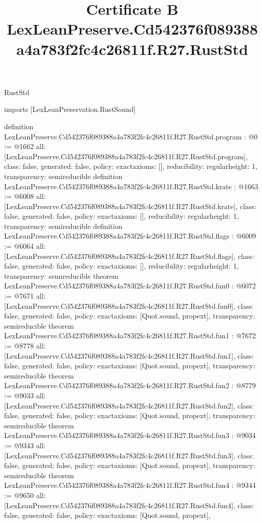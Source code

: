 \begin{lexlean}{RustStd}
\title{Certificate B LexLeanPreserve.Cd542376f089388a4a783f2fc4c26811f.R27.RustStd}
\begin{coremodule}
imports [LexLeanPreservation.RustSound]

definition LexLeanPreserve.Cd542376f089388a4a783f2fc4c26811f.R27.RustStd.program : @0 := @1662 {
  all: [LexLeanPreserve.Cd542376f089388a4a783f2fc4c26811f.R27.RustStd.program],
  class: false,
  generated: false,
  policy: exact{axioms: []},
  reducibility: regular{height: 1},
  transparency: semireducible
}
definition LexLeanPreserve.Cd542376f089388a4a783f2fc4c26811f.R27.RustStd.krate : @1663 := @6008 {
  all: [LexLeanPreserve.Cd542376f089388a4a783f2fc4c26811f.R27.RustStd.krate],
  class: false,
  generated: false,
  policy: exact{axioms: []},
  reducibility: regular{height: 1},
  transparency: semireducible
}
definition LexLeanPreserve.Cd542376f089388a4a783f2fc4c26811f.R27.RustStd.flags : @6009 := @6064 {
  all: [LexLeanPreserve.Cd542376f089388a4a783f2fc4c26811f.R27.RustStd.flags],
  class: false,
  generated: false,
  policy: exact{axioms: []},
  reducibility: regular{height: 1},
  transparency: semireducible
}
theorem LexLeanPreserve.Cd542376f089388a4a783f2fc4c26811f.R27.RustStd.fun0 : @6072 := @7671 {
  all: [LexLeanPreserve.Cd542376f089388a4a783f2fc4c26811f.R27.RustStd.fun0],
  class: false,
  generated: false,
  policy: exact{axioms: [Quot.sound, propext]},
  transparency: semireducible
}
theorem LexLeanPreserve.Cd542376f089388a4a783f2fc4c26811f.R27.RustStd.fun1 : @7672 := @8778 {
  all: [LexLeanPreserve.Cd542376f089388a4a783f2fc4c26811f.R27.RustStd.fun1],
  class: false,
  generated: false,
  policy: exact{axioms: [Quot.sound, propext]},
  transparency: semireducible
}
theorem LexLeanPreserve.Cd542376f089388a4a783f2fc4c26811f.R27.RustStd.fun2 : @8779 := @9033 {
  all: [LexLeanPreserve.Cd542376f089388a4a783f2fc4c26811f.R27.RustStd.fun2],
  class: false,
  generated: false,
  policy: exact{axioms: [Quot.sound, propext]},
  transparency: semireducible
}
theorem LexLeanPreserve.Cd542376f089388a4a783f2fc4c26811f.R27.RustStd.fun3 : @9034 := @9343 {
  all: [LexLeanPreserve.Cd542376f089388a4a783f2fc4c26811f.R27.RustStd.fun3],
  class: false,
  generated: false,
  policy: exact{axioms: [Quot.sound, propext]},
  transparency: semireducible
}
theorem LexLeanPreserve.Cd542376f089388a4a783f2fc4c26811f.R27.RustStd.fun4 : @9344 := @9650 {
  all: [LexLeanPreserve.Cd542376f089388a4a783f2fc4c26811f.R27.RustStd.fun4],
  class: false,
  generated: false,
  policy: exact{axioms: [Quot.sound, propext]},
}
\end{coremodule}
\end{lexlean}
